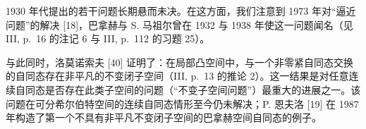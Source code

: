 1930 年代提出的若干问题长期悬而未决。在这方面，我们注意到 1973 年对“逼近问题”的解决 [18]，巴拿赫与 S. 马祖尔曾在 1932 与 1938 年使这一问题闻名（见 III, p.~16 的注记 6 与 III, p.~112 的习题 25）。

与此同时，洛莫诺索夫 [40] 证明了：在局部凸空间中，与一个非零紧自同态交换的自同态存在非平凡的不变闭子空间（III, p.~13 的推论 2）。这一结果是对任意连续自同态是否存在此类子空间的问题（“不变子空间问题”）最重大的进展之一。该问题在可分希尔伯特空间的连续自同态情形至今仍未解决；P. 恩夫洛 [19] 在 1987 年构造了第一个不具有非平凡不变闭子空间的巴拿赫空间自同态的例子。
